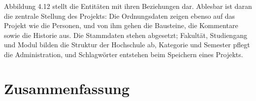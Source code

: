 Abbildung 4.12 stellt die Entitäten mit ihren Beziehungen dar. Ablesbar ist daran die zentrale Stellung des Projekts: Die Ordnungsdaten zeigen ebenso auf das Projekt wie die Personen, und von ihm gehen die Bausteine, die Kommentare sowie die Historie aus. Die Stammdaten stehen abgesetzt; Fakultät, Studiengang und Modul bilden die Struktur der Hochschule ab, Kategorie und Semester pflegt die Administration, und Schlagwörter entstehen beim Speichern eines Projekts.

\section{Zusammenfassung}
\label{sec:zusammenfassung-konzeption}

